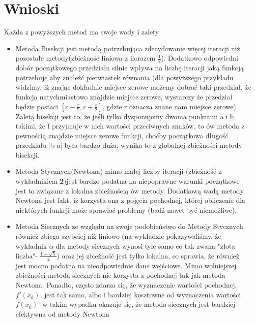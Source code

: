 \documentclass[a4paper,14pt]{report}
\begin{document}
  \section{Wnioski}
    Każda z powyższych metod ma swoje wady i zalety
    \begin{itemize}
      \item Metoda Bisekcji jest metodą potrzebująca zdecydowanie więcej iteracji niż pozostałe metody(zbieżność liniowa z ilorazem $\frac{1}{2}$). Dodatkowo odpowiedni dobór początkowego przedziału silnie wpływa na liczbę iteracji jaką funkcją potrzebuje aby znaleźć pierwiastek równania (dla powyższego przykładu widzimy, iż znając dokładnie miejsce zerowe możemy dobrać taki przedział, że funkcja natychmiastowo znajdzie miejsce zerowe, wystarczy że przedział będzie postaci $[r-\frac{r}{2},r+\frac{r}{2}]$, gdzie r oznacza znane nam miejsce zerowe). Zaletą bisekcji jest to, że jeśli tylko dysponujemy dwoma punktami a i  b takimi, że f przyjmuje w nich wartości przeciwnych znaków, to ów metoda z pewnością znajdzie miejsce zerowe funkcji, choćby początkowa długość przedziału |b-a| była bardzo duża: wynika to z globalnej zbieżności metody bisekcji.
      \item Metoda Stycznych(Newtona) mimo małej liczby iteracji (zbieżność z wykładnikiem \textbf{2})jest bardzo podatna na niepoprawne warunki początkowe- jest to związane z lokalna zbieżnością ów metody. Dodatkową wadą metody Newtona jest fakt, iż korzysta ona z pojęcia pochodnej, której obliczenie dla niektórych funkcji może sprawiać problemy (badź nawet być niemożliwe).
      \item Metoda Siecznych ze względu na swoje podobieństwo do Metody Stycznych również zbiega szybciej niż liniowo (na wykładzie pokazywaliśmy, że wykładnik $\alpha$ dla metody siecznych wynosi tyle samo co tak zwana "złota liczba"- ${\frac {1+{\sqrt {5}}}{2}}$) oraz jej zbieżność jest tylko lokalna, co sprawia, że również jest mocno podatna na nieodpowiednie dane wejściowe. Mimo wolniejszej zbieżności metoda siecznych nie korzysta z pochodnej tak jak metoda Newtona. Ponadto, często zdarza się, że wyznaczenie wartości pochodnej, $f'(x_{k})$, jest tak samo, albo i bardziej kosztowne od wyznaczenia wartości $f(x_{k})$-  w takim wypadku okazuje się, że metoda siecznych jest bardziej efektywna od metody Newtona
    \end{itemize}
\end{document}

